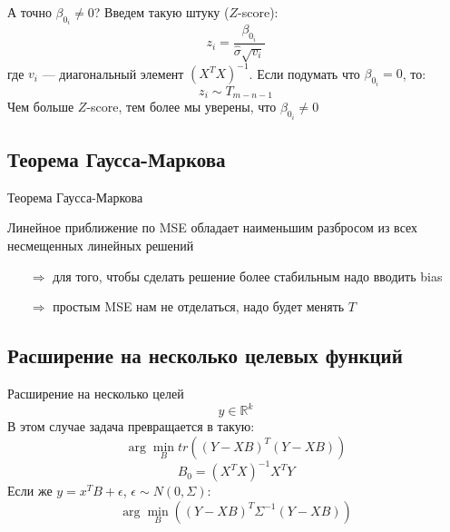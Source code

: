 \documentclass[14pt, fleqn, xcolor={dvipsnames, table}]{beamer}
\begin{document}
\begin{frame}{А точно $\beta_{0_i} \ne 0$?}
Введем такую штуку ($Z$-score):
$$
z_i = \frac{\beta_{0_i}}{\hat{\sigma}\sqrt{v_i}}
$$
где $v_i$ --- диагональный элемент $\left(X^TX\right)^{-1}$. Если подумать что $\beta_{0_i} = 0$, то:
$$
z_i \sim T_{m-n-1}
$$
Чем больше $Z$-score, тем более мы уверены, что $\beta_{0_i} \ne 0$
\end{frame}

\subsection{Теорема Гаусса-Маркова}
\begin{frame}{Теорема Гаусса-Маркова}
\begin{theorem}[]
Линейное приближение по MSE обладает наименьшим разбросом из всех несмещенных линейных решений
\end{theorem}
\begin{itemize}
\item[$\Rightarrow$] для того, чтобы сделать решение более стабильным надо вводить bias
\item[$\Rightarrow$] простым MSE нам не отделаться, надо будет менять $T$
\end{itemize}
\end{frame}

\subsection{Расширение на несколько целевых функций}
\begin{frame}{Расширение на несколько целей}
$$
y \in \mathbb{R}^k
$$
В этом случае задача превращается в такую:
$$
\arg \min_B tr\left((Y - XB)^T(Y - XB)\right)
$$
$$
B_0 = \left(X^TX\right)^{-1} X^TY
$$
Если же $y = x^TB + \epsilon$, $\epsilon \sim N(0, \Sigma)$:
$$
\arg \min_B \left((Y - XB)^T\Sigma^{-1}(Y - XB)\right)
$$
\end{frame}
\end{document}
